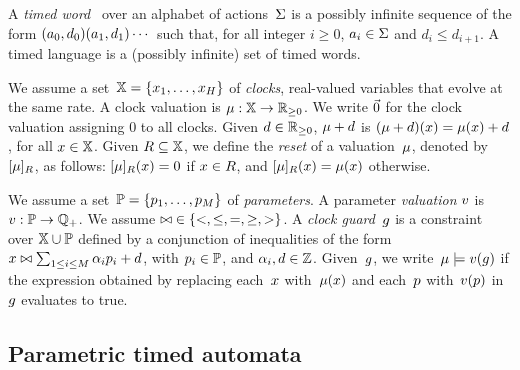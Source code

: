 \begin{tikzborder}{\cite{Gargantini16:validation}}
\begin{tikzborder}{\cite{gargantini_combinatorial_2017}}
\begin{tikzborder}{\cite{gargantini_combinatorial_2017}}
\begin{tikzborder}{\cite{garn2019}}
\begin{tikzborder}{\cite{arcaini2019achieving}}
\begin{tikzborder}{\cite{arcaini2019varivolution}}
\begin{tikzborder}{\cite{andre_tap_2019}}
A \emph{timed word}~\cite{AD94} over an alphabet of actions~$\Sigma$ is a possibly infinite sequence of the form
$(a_0 , d_0) (a_1, d_1) \cdots$
such that, for all integer $i \geq 0$, $a_i \in \Sigma$ and $d_i \leq d_{i+1}$.
A timed language is a (possibly infinite) set of timed words.

We assume a set~$\mathbb{X} = \{ x_1, \dots, x_H \} $ of \emph{clocks}, \ie{} real-valued variables that evolve at the same rate.
A clock valuation is 
$\mu : \mathbb{X} \rightarrow {\mathbb{R}}_{\geq 0}$.
We write $\vec{0}$ for the clock valuation assigning $0$ to all clocks.
Given $d \in {\mathbb{R}}_{\geq 0}$, $\mu + d$ is \st{} $(\mu + d)(x) = \mu(x) + d$, for all $x \in \mathbb{X}$.
%
Given $R \subseteq \mathbb{X}$, we define the \emph{reset} of a valuation~$\mu$, denoted by $[\mu]_{R}$, as follows: $[\mu]_{R}(x) = 0$ if $x \in R$, and $[\mu]_{R}(x)=\mu(x)$ otherwise.

We assume a set~$\mathbb{P} = \{ p_1, \dots, p_M \} $ of \emph{parameters}.
A parameter {\em valuation} $v$ is
$v : \mathbb{P} \rightarrow {\mathbb Q}_{+}$.
We assume ${\bowtie} \in \{<, \leq, =, \geq, >\}$.
A \emph{clock guard}~$g$ is a constraint over $\mathbb{X} \cup \mathbb{P}$ defined by a conjunction of inequalities of the form
$x \bowtie \sum_{1 \leq i \leq M} \alpha_i p_i + d$, with
$p_i \in \mathbb{P}$,
and
$\alpha_i, d \in {\mathbb Z}$.
%
Given~$g$, we write~$\mu\models v(g)$ if %
the expression obtained by replacing each~$x$ with~$\mu(x)$ and each~$p$ with~$v(p)$ in~$g$ evaluates to true.
\end{tikzborder}

\subsection{Parametric timed automata}


\end{tikzborder}
\end{tikzborder}
\end{tikzborder}
\end{tikzborder}
\end{tikzborder}
\end{tikzborder}
